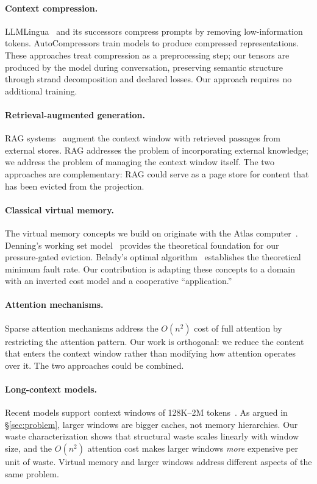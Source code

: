 \documentclass[sigplan,screen,anonymous]{acmart}
\begin{document}
\paragraph{Context compression.}
LLMLingua~\cite{jiang2023llmlingua} and its successors compress
prompts by removing low-information tokens. AutoCompressors
\cite{chevalier2023autocompressors} train models to produce compressed
representations. These approaches treat compression as a preprocessing
step; our tensors are produced by the model during conversation,
preserving semantic structure through strand decomposition and declared
losses. Our approach requires no additional training.

\paragraph{Retrieval-augmented generation.}
RAG systems~\cite{lewis2020rag} augment the context window with
retrieved passages from external stores. RAG addresses the problem
of incorporating external knowledge; we address the problem of
managing the context window itself. The two approaches are
complementary: RAG could serve as a page store for content that has
been evicted from the projection.

\paragraph{Classical virtual memory.}
The virtual memory concepts we build on originate with the Atlas
computer~\cite{kilburn1962atlas}. Denning's working set
model~\cite{denning1968working} provides the theoretical foundation
for our pressure-gated eviction. Belady's optimal
algorithm~\cite{belady1966anomaly} establishes the theoretical minimum
fault rate. Our contribution is adapting these concepts to a domain
with an inverted cost model and a cooperative ``application.''

\paragraph{Attention mechanisms.}
Sparse attention mechanisms
\cite{child2019generating,beltagy2020longformer,zaheer2020bigbird}
address the $O(n^2)$ cost of full attention by restricting the
attention pattern. Our work is orthogonal: we reduce the content
that enters the context window rather than modifying how attention
operates over it. The two approaches could be combined.

\paragraph{Long-context models.}
Recent models support context windows of 128K--2M
tokens~\cite{anthropic2024claude,google2024gemini}. As argued in
\S\ref{sec:problem}, larger windows are bigger caches, not memory
hierarchies. Our waste characterization shows that structural waste
scales linearly with window size, and the $O(n^2)$ attention cost
makes larger windows \emph{more} expensive per unit of waste. Virtual
memory and larger windows address different aspects of the same
problem.
\end{document}
